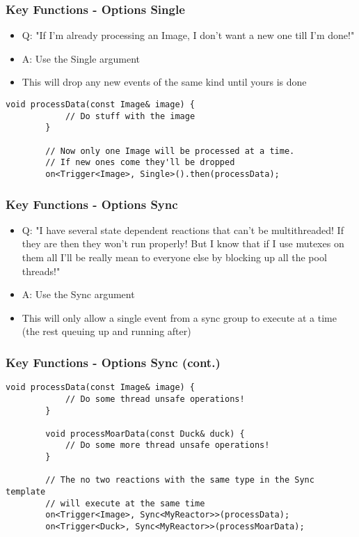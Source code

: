 \documentclass{beamer}
\begin{document}
\begin{frame}[fragile]
	\frametitle {Key Functions - Options Single}
	\begin{itemize}
		\item Q: "If I'm already processing an Image, I don't want a new one till I'm done!"
		\item A: Use the Single argument
		\item This will drop any new events of the same kind until yours is done
	\end{itemize}

	\begin{lstlisting}[language=nuclear]
		void processData(const Image& image) {
		    // Do stuff with the image
		}

		// Now only one Image will be processed at a time.
		// If new ones come they'll be dropped
		on<Trigger<Image>, Single>().then(processData);
	\end{lstlisting}
\end{frame}

\begin{frame}[fragile]
	\frametitle {Key Functions - Options Sync}
	\begin{itemize}
		\item Q: "I have several state dependent reactions that can't be multithreaded! If they are then they won't run properly! But I know that if I use mutexes on them all I'll be really mean to everyone else by blocking up all the pool threads!"
		\item A: Use the Sync argument
		\item This will only allow a single event from a sync group to execute at a time (the rest queuing up and running after)
	\end{itemize}
\end{frame}

\begin{frame}[fragile]
	\frametitle {Key Functions - Options Sync (cont.)}
	\begin{lstlisting}[language=nuclear]
		void processData(const Image& image) {
		    // Do some thread unsafe operations!
		}

		void processMoarData(const Duck& duck) {
		    // Do some more thread unsafe operations!
		}

		// The no two reactions with the same type in the Sync template
		// will execute at the same time
		on<Trigger<Image>, Sync<MyReactor>>(processData);
		on<Trigger<Duck>, Sync<MyReactor>>(processMoarData);
	\end{lstlisting}
\end{frame}
\end{document}
